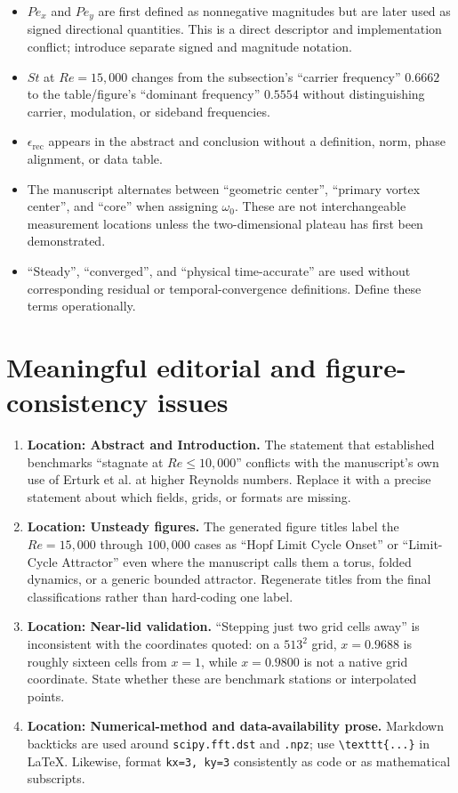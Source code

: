 \documentclass[11pt]{article}
\newcommand{\location}[1]{\textbf{Location: #1}}
\begin{document}
\begin{itemize}[leftmargin=*]
  \item $Pe_x$ and $Pe_y$ are first defined as nonnegative magnitudes but are later used as signed directional quantities.  This is a direct descriptor and implementation conflict; introduce separate signed and magnitude notation.
  \item $St$ at $Re=15{,}000$ changes from the subsection's ``carrier frequency'' $0.6662$ to the table/figure's ``dominant frequency'' $0.5554$ without distinguishing carrier, modulation, or sideband frequencies.
  \item $\epsilon_{\mathrm{rec}}$ appears in the abstract and conclusion without a definition, norm, phase alignment, or data table.
  \item The manuscript alternates between ``geometric center'', ``primary vortex center'', and ``core'' when assigning $\omega_0$.  These are not interchangeable measurement locations unless the two-dimensional plateau has first been demonstrated.
  \item ``Steady'', ``converged'', and ``physical time-accurate'' are used without corresponding residual or temporal-convergence definitions.  Define these terms operationally.
\end{itemize}

\section*{Meaningful editorial and figure-consistency issues}

\begin{enumerate}[leftmargin=*]
  \item \location{Abstract and Introduction.} The statement that established benchmarks ``stagnate at $Re\le10{,}000$'' conflicts with the manuscript's own use of Erturk et al. at higher Reynolds numbers.  Replace it with a precise statement about which fields, grids, or formats are missing.
  \item \location{Unsteady figures.} The generated figure titles label the $Re=15{,}000$ through $100{,}000$ cases as ``Hopf Limit Cycle Onset'' or ``Limit-Cycle Attractor'' even where the manuscript calls them a torus, folded dynamics, or a generic bounded attractor.  Regenerate titles from the final classifications rather than hard-coding one label.
  \item \location{Near-lid validation.} ``Stepping just two grid cells away'' is inconsistent with the coordinates quoted: on a $513^2$ grid, $x=0.9688$ is roughly sixteen cells from $x=1$, while $x=0.9800$ is not a native grid coordinate.  State whether these are benchmark stations or interpolated points.
  \item \location{Numerical-method and data-availability prose.} Markdown backticks are used around \texttt{scipy.fft.dst} and \texttt{.npz}; use \verb|\texttt{...}| in LaTeX.  Likewise, format \texttt{kx=3, ky=3} consistently as code or as mathematical subscripts.
\end{enumerate}
\end{document}
